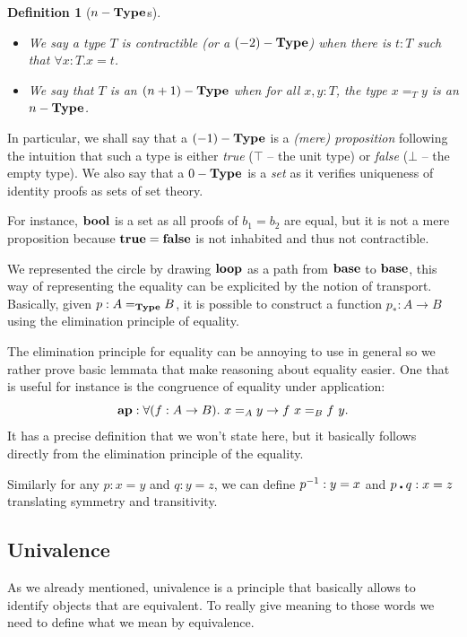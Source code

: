 \documentclass[11pt]{article}
\theoremstyle{plain}
\newtheorem{definition}{Definition}
\theoremstyle{remark}
\begin{document}
\begin{definition}[$n-\operatorname{\mathbf{Type}}$s]
  \leavevmode
  \begin{itemize}
    \item We say a type $T$ is \emph{contractible} (or a $(-2)-\operatorname{\mathbf{Type}}$) when
          there is $t : T$ such that $\forall x : T. x = t$.
    \item We say that $T$ is an $(n+1)-\operatorname{\mathbf{Type}}$ when for all $x, y : T$, the type
          $x =_T y$ is an $n-\operatorname{\mathbf{Type}}$.
  \end{itemize}
\end{definition}
%
\noindent
In particular, we shall say that a $(-1)-\operatorname{\mathbf{Type}}$ is a \emph{(mere) proposition}
following the intuition that such a type is either \emph{true} ($\top$ -- the
unit type) or \emph{false} ($\bot$ -- the empty type).
We also say that a $0-\operatorname{\mathbf{Type}}$ is a \emph{set} as it verifies uniqueness of
identity proofs as sets of set theory.

For instance, $\operatorname{\mathbf{bool}}$ is a set as all proofs of $b_1 = b_2$ are equal, but it
is not a mere proposition because $\operatorname{\mathbf{true}} = \operatorname{\mathbf{false}}$ is not inhabited and thus
not contractible.

We represented the circle by drawing $\operatorname{\mathbf{loop}}$ as a path from $\operatorname{\mathbf{base}}$ to
$\operatorname{\mathbf{base}}$, this way of representing the equality can be explicited by the notion
of transport.
Basically, given $p : A =_{\operatorname{\mathbf{Type}}} B$, it is possible to construct a function
$p_* : A \to B$ using the elimination principle of equality.

The elimination principle for equality can be annoying to use in general so we
rather prove basic lemmata that make reasoning about equality easier.
One that is useful for instance is the congruence of equality under application:
\[ \operatorname{\mathbf{ap}} : \forall (f : A \to B).\ x =_A y \to f\ x =_B f\ y. \]
\noindent
It has a precise definition that we won't state here, but it basically
follows directly from the elimination principle of the equality.

Similarly for any $p : x = y$ and $q : y = z$, we can define
$p^{-1} : y = x$ and $p \centerdot q : x = z$ translating symmetry and transitivity.

\subsection{Univalence}

As we already mentioned, univalence is a principle that basically allows to
identify objects that are equivalent. To really give meaning to those words we
need to define what we mean by equivalence.
\end{document}
